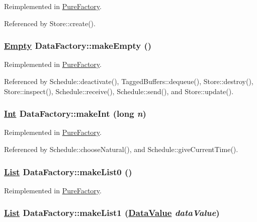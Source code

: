 Reimplemented in \hyperlink{classPureFactory_a9}{Pure\-Factory}.

Referenced by Store::create().

\hypertarget{interfaceDataFactory_a0}{
\subsubsection[makeEmpty]{\setlength{\rightskip}{0pt plus 5cm}\hyperlink{interfaceEmpty}{Empty} Data\-Factory::make\-Empty ()}}
\label{interfaceDataFactory_a0}




Reimplemented in \hyperlink{classPureFactory_a10}{Pure\-Factory}.

Referenced by Schedule::deactivate(), Tagged\-Buffers::dequeue(), Store::destroy(), Store::inspect(), Schedule::receive(), Schedule::send(), and Store::update().

\hypertarget{interfaceDataFactory_a2}{
\subsubsection[makeInt]{\setlength{\rightskip}{0pt plus 5cm}\hyperlink{interfaceInt}{Int} Data\-Factory::make\-Int (long {\em n})}}
\label{interfaceDataFactory_a2}




Reimplemented in \hyperlink{classPureFactory_a1}{Pure\-Factory}.

Referenced by Schedule::choose\-Natural(), and Schedule::give\-Current\-Time().

\hypertarget{interfaceDataFactory_a7}{
\subsubsection[makeList0]{\setlength{\rightskip}{0pt plus 5cm}\hyperlink{interfaceList}{List} Data\-Factory::make\-List0 ()}}
\label{interfaceDataFactory_a7}




Reimplemented in \hyperlink{classPureFactory_a5}{Pure\-Factory}.\hypertarget{interfaceDataFactory_a6}{
\subsubsection[makeList1]{\setlength{\rightskip}{0pt plus 5cm}\hyperlink{interfaceList}{List} Data\-Factory::make\-List1 (\hyperlink{interfaceDataValue}{Data\-Value} {\em data\-Value})}}
\label{interfaceDataFactory_a6}




